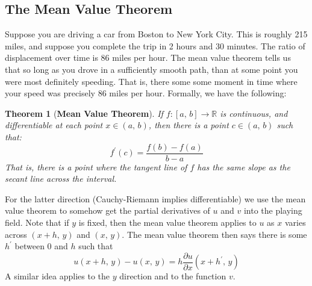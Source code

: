 \documentclass{article}
\newtheorem{theorem}{Theorem}[section]
\theoremstyle{definition}
\begin{document}
        \subsection{The Mean Value Theorem}
            Suppose you are driving a car from Boston to New York City.
            This is roughly 215 miles, and suppose you complete the trip
            in 2 hours and 30 minutes. The ratio of displacement over time
            is $86$ miles per hour. The mean value theorem tells us that
            so long as you drove in a sufficiently smooth path, than at some
            point you were most definitely speeding. That is, there some some
            moment in time where your speed was precisely $86$ miles per hour.
            Formally, we have the following:
            \begin{theorem}[\textbf{Mean Value Theorem}]
                If $f:[a,\,b]\rightarrow\mathbb{R}$ is continuous, and
                differentiable at each point $x\in(a,\,b)$, then there is a
                point $c\in(a,\,b)$ such that:
                \begin{equation}
                    f^{\prime}(c)=\frac{f(b)-f(a)}{b-a}
                \end{equation}
                That is, there is a point where the tangent line of $f$ has
                the same slope as the secant line across the interval.
            \end{theorem}
            For the latter direction (Cauchy-Riemann implies differentiable)
            we use the mean value theorem to somehow get the partial
            derivatives of $u$ and $v$ into the playing field. Note that if
            $y$ is fixed, then the mean value theorem applies to $u$ as $x$
            varies across $(x+h,\,y)$ and $(x,\,y)$. The mean value theorem
            then says there is some $h^{\prime}$ between $0$ and $h$ such
            that
            \begin{equation}
                u(x+h,\,y)-u(x,\,y)
                =h\frac{\partial{u}}{\partial{x}}
                (x+h^{\prime},\,y)
            \end{equation}
            A similar idea applies to the $y$ direction and to the function $v$.
\end{document}
